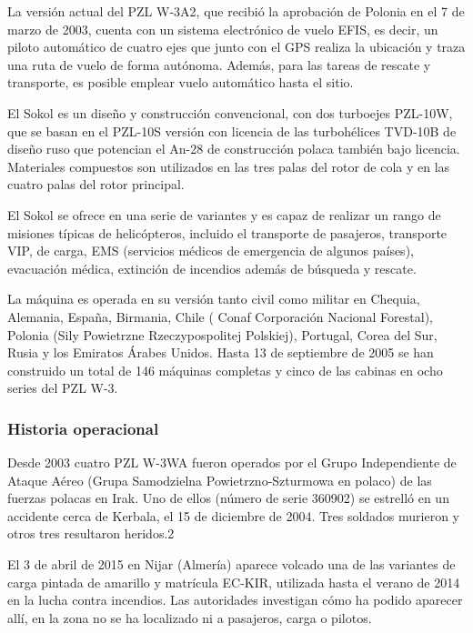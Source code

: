 La versión actual del PZL W-3A2, que recibió la aprobación de Polonia en el 7 de marzo de 2003, cuenta con un sistema electrónico de vuelo EFIS, es decir, un piloto automático de cuatro ejes que junto con el GPS realiza la ubicación y traza una ruta de vuelo de forma autónoma. Además, para las tareas de rescate y transporte, es posible emplear vuelo automático hasta el sitio.


El Sokol es un diseño y construcción convencional, con dos turboejes PZL-10W, que se basan en el PZL-10S versión con licencia de las turbohélices TVD-10B de diseño ruso que potencian el An-28 de construcción polaca también bajo licencia. Materiales compuestos son utilizados en las tres palas del rotor de cola y en las cuatro palas del rotor principal.


El Sokol se ofrece en una serie de variantes y es capaz de realizar un rango de misiones típicas de helicópteros, incluido el transporte de pasajeros, transporte VIP, de carga, EMS (servicios médicos de emergencia de algunos países), evacuación médica, extinción de incendios además de búsqueda y rescate.


La máquina es operada en su versión tanto civil como militar en Chequia, Alemania, España, Birmania, Chile ( Conaf Corporación Nacional Forestal), Polonia (Sily Powietrzne Rzeczypospolitej Polskiej), Portugal, Corea del Sur, Rusia y los Emiratos Árabes Unidos. Hasta 13 de septiembre de 2005 se han construido un total de 146 máquinas completas y cinco de las cabinas en ocho series del PZL W-3. 
\subsubsection{Historia operacional}
Desde 2003 cuatro PZL W-3WA fueron operados por el Grupo Independiente de Ataque Aéreo (Grupa Samodzielna Powietrzno-Szturmowa en polaco) de las fuerzas polacas en Irak. Uno de ellos (número de serie 360902) se estrelló en un accidente cerca de Kerbala, el 15 de diciembre de 2004. Tres soldados murieron y otros tres resultaron heridos.2​


El 3 de abril de 2015 en Nijar (Almería) aparece volcado una de las variantes de carga pintada de amarillo y matrícula EC-KIR, utilizada hasta el verano de 2014 en la lucha contra incendios. Las autoridades investigan cómo ha podido aparecer allí, en la zona no se ha localizado ni a pasajeros, carga o pilotos.
